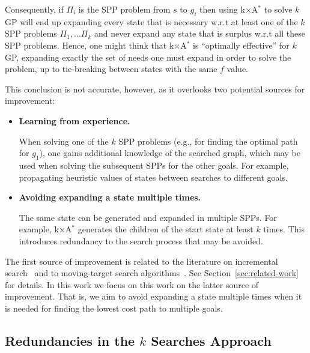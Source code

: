 \documentclass{aicom2e}
\newcommand{\kgs}{$k$GP}
\newcommand{\kxastar}{k$\times$A$^*$}
\begin{document}
Consequently, if $\Pi_i$ is the SPP problem from $s$ to $g_i$
then using \kxastar{} to solve \kgs{} will end up expanding every state that is necessary w.r.t at least one of the $k$ SPP problems $\Pi_1,\ldots \Pi_k$ and never expand any state that is surplus w.r.t all these SPP problems.
Hence, one might think that \kxastar{} is ``optimally effective'' for \kgs{},
expanding exactly the set of needs one must expand in order to solve the problem, up to tie-breaking between states with the same $f$ value.


This conclusion is not accurate, however, as it overlooks two potential sources for improvement:
\begin{itemize}

\item {\bf Learning from experience.}

When solving one of the $k$ SPP problems (e.g., for finding the optimal path for $g_1$), 
one gains additional knowledge of the searched graph, which may be used when solving the subsequent
SPPs for the other goals. For example, propagating heuristic values of states between searches to different goals.

\item {\bf Avoiding expanding a state multiple times.}

The same state can be generated and expanded in multiple SPPs. For example, \kxastar{} 
generates the children of the start state at least $k$ times. 
This introduces redundancy to the search process that may be avoided.
\end{itemize}

The first source of improvement is related to the literature on incremental
search~\cite{koenig2004lifelong} and to moving-target search
algorithms~\cite{ishida1995moving,koenig2007speeding}. See
Section~\ref{sec:related-work} for details. In this work we focus on this work
on the latter source of improvement. That is, we aim to avoid expanding a state
multiple times when it is needed for finding the lowest cost path to multiple goals.


\subsection{Redundancies in the $k$ Searches Approach}
\end{document}
